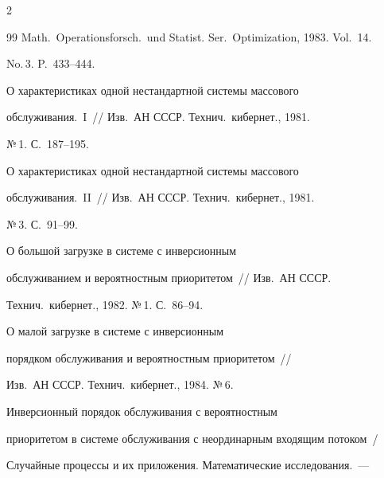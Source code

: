 \begin{multicols}{2}
{{\begin{thebibliography}{99}
Math.\ Operationsforsch.\ und Statist. Ser.\ Optimization, 1983. Vol.~14.


No.\,3. P.~433--444.









О характеристиках одной нестандартной системы массового


обслуживания.~I~// Изв.\ АН СССР. Технич.\ кибернет., 1981.


№\,1. С.~187--195.









О характеристиках одной нестандартной системы массового


обслуживания.~II~// Изв.\ АН СССР. Технич.\ кибернет., 1981.


№\,3. С.~91--99.









О большой загрузке в системе с инверсионным


обслуживанием и вероятностным приоритетом~// Изв.\ АН СССР.


Технич.\ кибернет., 1982. №\,1. С.~86--94.









О малой загрузке в системе с инверсионным


порядком обслуживания и вероятностным приоритетом~//


Изв.\ АН СССР. Технич.\ кибернет., 1984. №\,6.









Инверсионный порядок обслуживания с вероятностным


приоритетом в системе обслуживания с неординарным входящим потоком~/


Случайные процессы и их приложения. Математические исследования.~---



\end{thebibliography}}}
\end{multicols}
